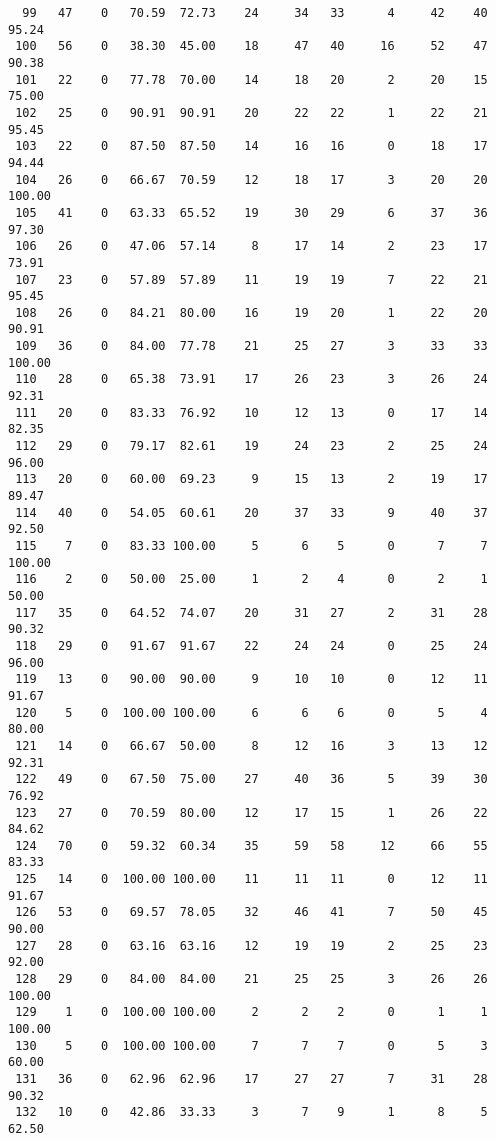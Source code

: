 \begin{verbatim}
  99   47    0   70.59  72.73    24     34   33      4     42    40    95.24
 100   56    0   38.30  45.00    18     47   40     16     52    47    90.38
 101   22    0   77.78  70.00    14     18   20      2     20    15    75.00
 102   25    0   90.91  90.91    20     22   22      1     22    21    95.45
 103   22    0   87.50  87.50    14     16   16      0     18    17    94.44
 104   26    0   66.67  70.59    12     18   17      3     20    20   100.00
 105   41    0   63.33  65.52    19     30   29      6     37    36    97.30
 106   26    0   47.06  57.14     8     17   14      2     23    17    73.91
 107   23    0   57.89  57.89    11     19   19      7     22    21    95.45
 108   26    0   84.21  80.00    16     19   20      1     22    20    90.91
 109   36    0   84.00  77.78    21     25   27      3     33    33   100.00
 110   28    0   65.38  73.91    17     26   23      3     26    24    92.31
 111   20    0   83.33  76.92    10     12   13      0     17    14    82.35
 112   29    0   79.17  82.61    19     24   23      2     25    24    96.00
 113   20    0   60.00  69.23     9     15   13      2     19    17    89.47
 114   40    0   54.05  60.61    20     37   33      9     40    37    92.50
 115    7    0   83.33 100.00     5      6    5      0      7     7   100.00
 116    2    0   50.00  25.00     1      2    4      0      2     1    50.00
 117   35    0   64.52  74.07    20     31   27      2     31    28    90.32
 118   29    0   91.67  91.67    22     24   24      0     25    24    96.00
 119   13    0   90.00  90.00     9     10   10      0     12    11    91.67
 120    5    0  100.00 100.00     6      6    6      0      5     4    80.00
 121   14    0   66.67  50.00     8     12   16      3     13    12    92.31
 122   49    0   67.50  75.00    27     40   36      5     39    30    76.92
 123   27    0   70.59  80.00    12     17   15      1     26    22    84.62
 124   70    0   59.32  60.34    35     59   58     12     66    55    83.33
 125   14    0  100.00 100.00    11     11   11      0     12    11    91.67
 126   53    0   69.57  78.05    32     46   41      7     50    45    90.00
 127   28    0   63.16  63.16    12     19   19      2     25    23    92.00
 128   29    0   84.00  84.00    21     25   25      3     26    26   100.00
 129    1    0  100.00 100.00     2      2    2      0      1     1   100.00
 130    5    0  100.00 100.00     7      7    7      0      5     3    60.00
 131   36    0   62.96  62.96    17     27   27      7     31    28    90.32
 132   10    0   42.86  33.33     3      7    9      1      8     5    62.50

\end{verbatim}
